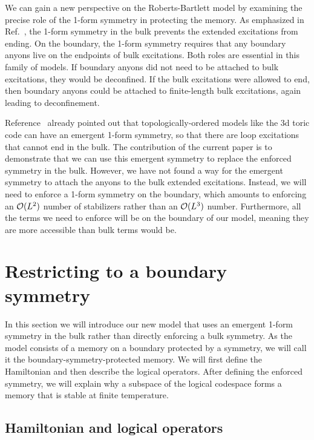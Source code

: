 We can gain a new perspective on the Roberts-Bartlett model by examining the precise role of the 1-form symmetry in protecting the memory. As emphasized in Ref.~\cite{RobertsBartlett2020}, the 1-form symmetry in the bulk prevents the extended excitations from ending. On the boundary, the 1-form symmetry requires that any boundary anyons live on the endpoints of bulk excitations. Both roles are essential in this family of models. If boundary anyons did not need to be attached to bulk excitations, they would be deconfined. If the bulk excitations were allowed to end, then boundary anyons could be attached to finite-length bulk excitations, again leading to deconfinement.

Reference~\cite{RobertsBartlett2020} already pointed out that topologically-ordered models like the 3d toric code can have an emergent 1-form symmetry, so that there are loop excitations that cannot end in the bulk. 
The contribution of the current paper is to demonstrate that we can use this emergent symmetry to replace the enforced symmetry in the bulk. However, we have not found a way for the emergent symmetry to attach the anyons to the bulk extended excitations. Instead, we will  need to enforce a 1-form symmetry on the boundary, which amounts to enforcing an $\cal{O}(L^2)$ number of stabilizers rather than an $\cal{O}(L^3)$ number. Furthermore, all the terms we need to enforce will be on the boundary of our model, meaning they are more accessible than bulk terms would be.

\section{Restricting to a boundary symmetry} \label{sec:boundary}

In this section we will introduce our new model that uses an emergent 1-form symmetry in the bulk rather than directly enforcing a bulk symmetry. As the model consists of a memory on a boundary protected by a symmetry, we will call it the boundary-symmetry-protected memory. We will first define the Hamiltonian and then describe the logical operators. After defining the enforced symmetry, we will explain why a subspace of the logical codespace forms a memory that is stable at finite temperature.

\subsection{Hamiltonian and logical operators} \label{sub:Hamiltonian}

